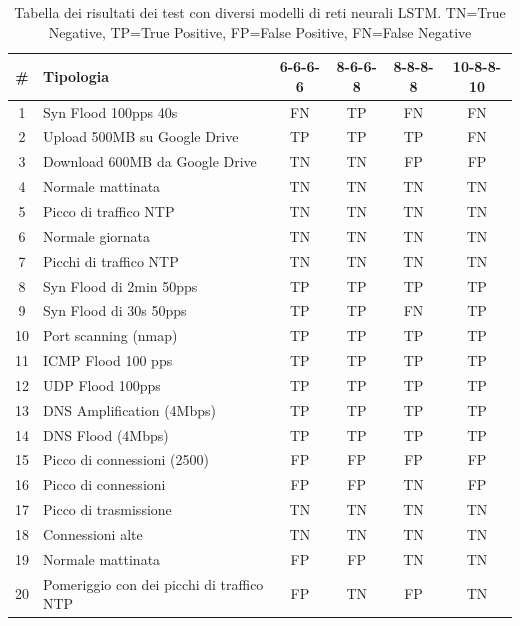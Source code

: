 \FloatBarrier
\begin{table}
    \begin{tabularx}{\textwidth}{||c X c c c c||} 
        \hline
        \# & Tipologia & 6-6-6-6 & 8-6-6-8 & 8-8-8-8 & 10-8-8-10\\ [0.5ex] 
        \hline\hline
        1 & Syn Flood 100pps 40s & \cellcolor{magenta} FN & TP & \cellcolor{magenta} FN & \cellcolor{magenta} FN  \\ 
        \hline
        2 & Upload 500MB su Google Drive & TP & TP & TP & \cellcolor{magenta} FN   \\ 
        \hline
        3 &  Download 600MB da Google Drive & TN  & TN & \cellcolor{orange} FP & \cellcolor{orange} FP \\ 
        \hline 
        4 & Normale mattinata & TN & TN & TN & TN \\
        \hline
        5 & Picco di traffico NTP & TN & TN & TN & TN  \\
        \hline
        6 & Normale giornata & TN & TN & TN & TN  \\ 
        \hline
        7 & Picchi di traffico NTP & TN & TN & TN & TN   \\ 
        \hline 
        8 & Syn Flood di 2min 50pps & TP & TP & TP & TP  \\
        \hline
        9 & Syn Flood di 30s 50pps & TP & TP & \cellcolor{magenta} FN & TP  \\        
        \hline
        10 & Port scanning (nmap) & TP & TP & TP & TP   \\
        \hline
        11 & ICMP Flood 100 pps & TP & TP & TP & TP \\
        \hline
        12 & UDP Flood 100pps & TP & TP & TP & TP \\ 
        \hline
        13 & DNS Amplification (4Mbps) & TP & TP & TP & TP \\ 
        \hline 
        14 & DNS Flood (4Mbps) & TP & TP & TP & TP \\
        \hline
        15 & Picco di connessioni (2500) & \cellcolor{orange} FP & \cellcolor{orange} FP & \cellcolor{orange} FP & \cellcolor{orange} FP \\        
        \hline 
        16 & Picco di connessioni & \cellcolor{orange} FP & \cellcolor{orange} FP & TN &  \cellcolor{orange} FP \\        
        \hline
        17 & Picco di trasmissione & TN & TN & TN & TN\\        
        \hline
        18 & Connessioni alte & TN & TN & TN & TN\\
        \hline
        19 & Normale mattinata & \cellcolor{orange} FP & \cellcolor{orange} FP & TN & TN \\ 
        \hline
        20 & Pomeriggio con dei picchi di traffico NTP & \cellcolor{orange} FP & TN & \cellcolor{orange} FP & TN\\ 
        \hline
    \end{tabularx}
    \caption{Tabella dei risultati dei test con diversi modelli di reti neurali LSTM. TN=True Negative, TP=True Positive,  FP=False Positive,  FN=False Negative}
    \label{table:LSTM_tests}
\end{table}
\FloatBarrier

